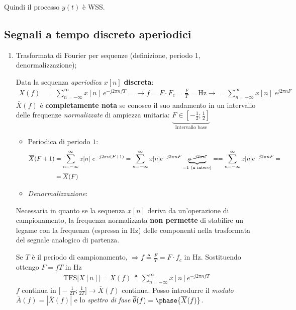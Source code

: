 \documentclass[
]{article}
\begin{document}
\begin{enumerate}
\begin{itemize}
    Quindi il processo \(y(t)\) è WSS.
  \end{itemize}
\end{enumerate}

\subsection{Segnali a tempo discreto
aperiodici}\label{segnali-a-tempo-discreto-aperiodici}

\begin{enumerate}
\def\labelenumi{\arabic{enumi}.}
\setcounter{enumi}{1}
\item
  Trasformata di Fourier per sequenze (definizione, periodo 1,
  denormalizzazione);

  Data la sequenza \emph{aperiodica} \(x[n]\) \textbf{discreta}:
  \begin{align*}
   \overline{X}(f) &= \sum_{n=-\infty}^{\infty}x[n]\ e^{-j2\pi nfT} = \longrightarrow f=F\cdot F_{c} = \frac{F}{T} = \si{\hertz} \longrightarrow
   = \sum_{n=-\infty}^{\infty}x[n] \ e^{j2\pi nF}
   \end{align*} \(\overline{X}(f)\) è \textbf{completamente nota} se
  conosco il suo andamento in un intervallo delle frequenze
  \emph{normalizzate} di ampiezza unitaria:
  \(\underbrace{F\in [-\frac{1}{2}; \frac{1}{2}]}_{\text{Intervallo base}}\)

  \begin{itemize}
  \item
    Periodica di periodo \(1\): \begin{align*}
     \overline{X}(F+1) &= \sum_{n=-\infty}^{\infty} x[n] \ e^{-j2\pi n(F+1)} =
     \sum_{n=-\infty}^{\infty} x[n] e^{-j2\pi nF}\underbrace{\cancel{e^{-j2\pi n}}}_{=1 \text{ (n intero)}} =
     =\sum_{n=-\infty}^{\infty} x[n] e^{-j2\pi nF} = \\ &= \overline{X}(F)
     \end{align*}
  \item
    \emph{Denormalizzazione}:
  \end{itemize}

  Necessaria in quanto se la sequenza \(x[n]\) deriva da un'operazione
  di campionamento, la frequenza normalizzata \textbf{non permette} di
  stabilire un legame con la frequenza (espressa in \si{\Hz}) delle
  componenti nella trasformata del segnale analogico di partenza.

  Se \(T\) è il periodo di campionamento,
  \(\Rightarrow f \triangleq \frac{F}{T} = F \cdot f_{c}\) in
  \si{\hertz}. Sostituendo ottengo \(F=fT\) in \si{\Hz} \begin{gather*}
   \text{TFS}\Big[X[n]\Big] = \overline{X}(f) \triangleq \sum_{n=-\infty}^{\infty} x[n] e^{-j2\pi nfT}
   \end{gather*} \(f\) continua in
  \(\Big[ -\frac{1}{2T}; \frac{1}{2T} \Big] \to \overline{X}(f)\)
  continua. Posso introdurre il \emph{modulo}
  \(\overline{A}(f)=|\overline{X}(f)|\) e lo \emph{spettro di fase}
  \(\overline{\theta}(f)= \phase{\overline{X}(f)}\).


\end{enumerate}
\end{document}
